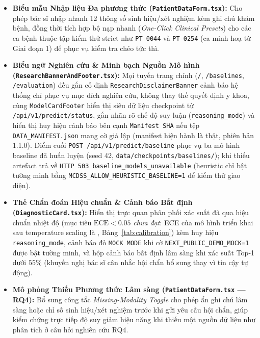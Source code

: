 \begin{itemize}[leftmargin=1.8em, itemsep=0.2em]
    \item \textbf{Biểu mẫu Nhập liệu Đa phương thức (\texttt{PatientDataForm.tsx}):} Cho phép bác sĩ nhập nhanh 12 thông số sinh hiệu/xét nghiệm kèm ghi chú khám bệnh, đồng thời tích hợp bộ nạp nhanh (\textit{One-Click Clinical Presets}) cho các ca bệnh thuộc tập kiểm thử strict như \texttt{PT-0044} và \texttt{PT-0254} (ca minh hoạ từ Giai đoạn 1) để phục vụ kiểm tra chéo tức thì.
    \item \textbf{Biểu ngữ Nghiên cứu \& Minh bạch Nguồn Mô hình (\texttt{ResearchBannerAndFooter.tsx}):} Mọi tuyến trang chính (\texttt{/}, \texttt{/baselines}, \texttt{/evaluation}) đều gắn cố định \texttt{ResearchDisclaimerBanner} cảnh báo hệ thống chỉ phục vụ mục đích nghiên cứu, không thay thế quyết định y khoa, cùng \texttt{ModelCardFooter} hiển thị siêu dữ liệu checkpoint từ \texttt{/api/v1/predict/status}, gắn nhãn rõ chế độ suy luận (\texttt{reasoning\_mode}) và hiển thị huy hiệu cảnh báo bên cạnh \texttt{Manifest SHA} nếu tệp \texttt{DATA\_MANIFEST.json} mang cờ giả lập (manifest hiện hành là thật, phiên bản 1.1.0). Điểm cuối \texttt{POST /api/v1/predict/baseline} phục vụ ba mô hình baseline đã huấn luyện (seed 42, \texttt{data/checkpoints/baselines/}); khi thiếu artefact trả về \texttt{HTTP 503 baseline\_models\_unavailable} (heuristic chỉ bật tường minh bằng \texttt{MCDSS\_ALLOW\_HEURISTIC\_BASELINE=1} để kiểm thử giao diện).
    \item \textbf{Thẻ Chẩn đoán Hiệu chuẩn \& Cảnh báo Bất định (\texttt{DiagnosticCard.tsx}):} Hiển thị trực quan phân phối xác suất đã qua hiệu chuẩn nhiệt độ (mục tiêu $\text{ECE} < 0.05$ \emph{chưa đạt}: ECE của mô hình triển khai sau temperature scaling là \eceTemp, Bảng~\ref{tab:calibration}) kèm huy hiệu \texttt{reasoning\_mode}, cảnh báo đỏ \texttt{MOCK MODE} khi cờ \texttt{NEXT\_PUBLIC\_DEMO\_MOCK=1} được bật tường minh, và hộp cảnh báo bất định lâm sàng khi xác suất Top-1 dưới $55\%$ (khuyến nghị bác sĩ cân nhắc hội chẩn bổ sung thay vì tin cậy tự động).
    \item \textbf{Mô phỏng Thiếu Phương thức Lâm sàng (\texttt{PatientDataForm.tsx} --- RQ4):} Bổ sung công tắc \textit{Missing-Modality Toggle} cho phép ẩn ghi chú lâm sàng hoặc chỉ số sinh hiệu/xét nghiệm trước khi gửi yêu cầu hội chẩn, giúp kiểm chứng trực tiếp độ suy giảm hiệu năng khi thiếu một nguồn dữ liệu như phân tích ở câu hỏi nghiên cứu RQ4.

\end{itemize}
